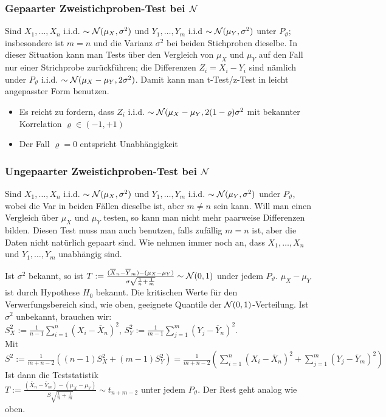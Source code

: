 \subsubsection{Gepaarter Zweistichproben-Test bei $\mathcal{N}$}
Sind $X_1, \dots, X_n$ i.i.d. $\sim \mathcal{N}(\mu_X, \sigma^2)$ und $Y_1, \dots, Y_m$ i.i.d $\sim \mathcal{N}(\mu_Y, \sigma^2)$ unter $P_\vartheta$; insbesondere ist $m = n$ und die Varianz $\sigma^2$ bei beiden Stichproben dieselbe. In dieser Situation kann man Tests über den Vergleich von $\mu_X$ und $\mu_Y$ auf den Fall nur einer Strichprobe zurückführen; die Differenzen $Z_i = X_i - Y_i$ sind nämlich under $P_\vartheta$ i.i.d. $\sim \mathcal{N}(\mu_X - \mu_Y, 2 \sigma^2)$. Damit kann man t-Test/z-Test in leicht angepasster Form benutzen.

\begin{itemize}
    \item Es reicht zu fordern, dass $Z_i$ i.i.d. $\sim \mathcal{N}(\mu_X - \mu_Y, 2 (1 - \varrho)\sigma^2$ mit bekannter Korrelation $\varrho \in (-1, +1)$
    \item Der Fall $\varrho = 0$ entspricht Unabhängigkeit
\end{itemize}

\subsubsection{Ungepaarter Zweistichproben-Test bei $\mathcal{N}$}
Sind $X_1, \dots, X_n$ i.i.d. $\sim \mathcal{N}(\mu_X, \sigma^2)$ und $Y_1, \dots, Y_m$ i.i.d. $\sim \mathcal{N}(\mu_Y, \sigma^2)$ under $P_\vartheta$, wobei die Var in beiden Fällen dieselbe ist, aber $m \neq n$ sein kann. Will man einen Vergleich über $\mu_X$ und $\mu_Y$ testen, so kann man nicht mehr paarweise Differenzen bilden. Diesen Test muss man auch benutzen, falls zufällig $m = n$ ist, aber die Daten nicht natürlich gepaart sind. Wie nehmen immer noch an, dass $X_1, \dots, X_n$ und $Y_1, \dots, Y_m$ unabhängig sind.
\begin{itemize}
     Ist $\sigma^2$ bekannt, so ist $T := \frac{(\overline{X}_n - \overline{Y}_m) - (\mu_X - \mu_Y)}{\sigma \sqrt{\frac{1}{n} + \frac{1}{m}}} \sim \mathcal{N}(0, 1)$ under jedem $P_\vartheta$. $\mu_X - \mu_Y$ ist durch Hypothese $H_0$ bekannt. Die kritischen Werte für den Verwerfungsbereich sind, wie oben, geeignete Quantile der $\mathcal{N}(0, 1)$-Verteilung.
     Ist $\sigma^2$ unbekannt, brauchen wir: \\
    $S_X^2:= \frac{1}{n - 1} \sum_{i=1}^{n}(X_i - \overline{X}_n)^2$,
    $S_Y^2:= \frac{1}{m - 1} \sum_{j=1}^{m}(Y_j - \overline{Y}_n)^2$. \\
    Mit $S^2 := \frac{1}{m + n - 2}((n - 1)S_X^2 + (m - 1)S_Y^2) = \frac{1}{m + n - 2} (\sum_{i=1}^{n} (X_i - \overline{X}_n)^2 + \sum_{j=1}^{m}(Y_j - \overline{Y}_m)^2)$\\
   Ist dann die Teststatistik\\
   $T := \frac{(\overline{X}_n - \overline{Y}_m) - (\mu_X - \mu_Y)}{S \sqrt{\frac{1}{n} + \frac{1}{m}}} \sim t_{n + m - 2}$ unter jedem $P_\vartheta$. Der Rest geht analog wie oben.
\end{itemize}

